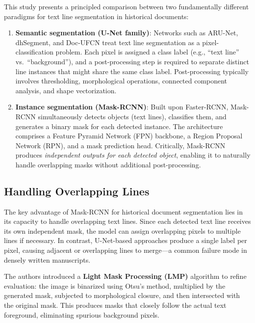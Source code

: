 \documentclass[11pt, a4paper]{article}
\begin{document}
This study presents a principled comparison between two fundamentally different paradigms for text line segmentation in historical documents:

\begin{enumerate}[leftmargin=1.5em]
    \item \textbf{Semantic segmentation (U-Net family)}: Networks such as ARU-Net, dhSegment, and Doc-UFCN treat text line segmentation as a pixel-classification problem. Each pixel is assigned a class label (e.g., ``text line'' vs.\ ``background''), and a post-processing step is required to separate distinct line instances that might share the same class label. Post-processing typically involves thresholding, morphological operations, connected component analysis, and shape vectorization.
    
    \item \textbf{Instance segmentation (Mask-RCNN)}: Built upon Faster-RCNN, Mask-RCNN simultaneously detects objects (text lines), classifies them, and generates a binary mask for each detected instance. The architecture comprises a Feature Pyramid Network (FPN) backbone, a Region Proposal Network (RPN), and a mask prediction head. Critically, Mask-RCNN produces \textit{independent outputs for each detected object}, enabling it to naturally handle overlapping masks without additional post-processing.
\end{enumerate}

\subsection{Handling Overlapping Lines}

The key advantage of Mask-RCNN for historical document segmentation lies in its capacity to handle overlapping text lines. Since each detected text line receives its own independent mask, the model can assign overlapping pixels to multiple lines if necessary. In contrast, U-Net-based approaches produce a single label per pixel, causing adjacent or overlapping lines to merge---a common failure mode in densely written manuscripts.

The authors introduced a \textbf{Light Mask Processing (LMP)} algorithm to refine evaluation: the image is binarized using Otsu's method, multiplied by the generated mask, subjected to morphological closure, and then intersected with the original mask. This produces masks that closely follow the actual text foreground, eliminating spurious background pixels.
\end{document}
